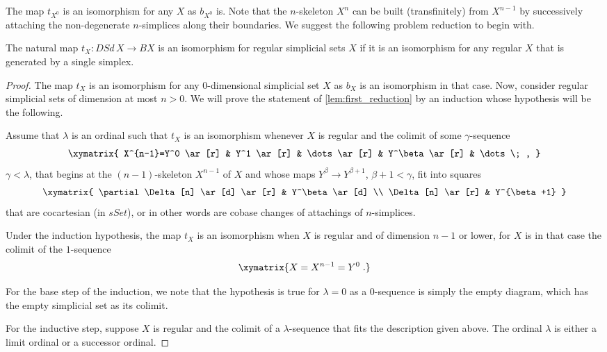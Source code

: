 The map $t_{X^0}$ is an isomorphism for any $X$ as $b_{X^0}$ is. Note that the $n$-skeleton $X^n$ can be built (transfinitely) from $X^{n-1}$ by successively attaching the non-degenerate $n$-simplices along their boundaries. We suggest the following problem reduction to begin with.
\begin{lemma}\label{lem:first_reduction}
The natural map $t_X:DSd\, X\to BX$ is an isomorphism for regular simplicial sets $X$ if it is an isomorphism for any regular $X$ that is generated by a single simplex.
\end{lemma}
\begin{proof}
The map $t_X$ is an isomorphism for any $0$-dimensional simplicial set $X$ as $b_X$ is an isomorphism in that case. Now, consider regular simplicial sets of dimension at most $n>0$. We will prove the statement of \cref{lem:first_reduction} by an induction whose hypothesis will be the following.

Assume that $\lambda$ is an ordinal such that $t_X$ is an isomorphism whenever $X$ is regular and the colimit of some $\gamma$-sequence
\begin{displaymath}
\xymatrix{
X^{n-1}=Y^0 \ar[r] & Y^1 \ar[r] & \dots \ar[r] & Y^\beta \ar[r] & \dots \; ,
}
\end{displaymath}
$\gamma <\lambda$, that begins at the $(n-1)$-skeleton $X^{n-1}$ of $X$ and whose maps $Y^\beta \to Y^{\beta +1}$, $\beta +1<\gamma$, fit into squares
\begin{displaymath}
\xymatrix{
\partial \Delta [n] \ar[d] \ar[r] & Y^\beta \ar[d] \\
\Delta [n] \ar[r] & Y^{\beta +1}
}
\end{displaymath}
that are cocartesian (in $sSet$), or in other words are cobase changes of attachings of $n$-simplices.

Under the induction hypothesis, the map $t_X$ is an isomorphism when $X$ is regular and of dimension $n-1$ or lower, for $X$ is in that case the colimit of the $1$-sequence
\begin{displaymath}
\xymatrix{
X=X^{n-1}=Y^0\; .
}
\end{displaymath}

For the base step of the induction, we note that the hypothesis is true for $\lambda =0$ as a $0$-sequence is simply the empty diagram, which has the empty simplicial set as its colimit.

For the inductive step, suppose $X$ is regular and the colimit of a $\lambda$-sequence that fits the description given above. The ordinal $\lambda$ is either a limit ordinal or a successor ordinal.


\end{proof}
